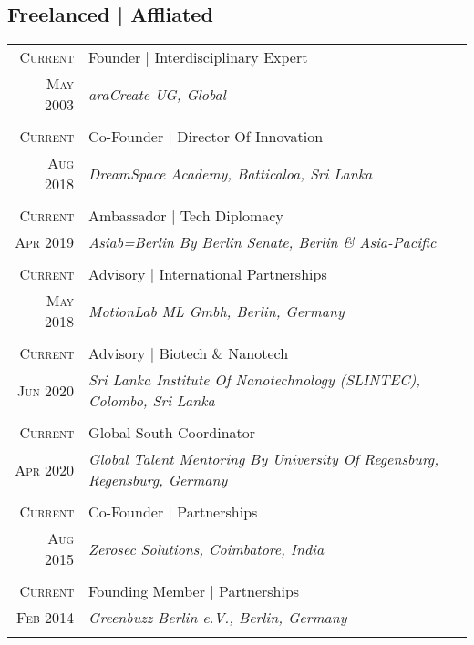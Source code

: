 \subsection{Freelanced | Affliated}
\begin{longtable}
	{r|p{12cm}}

	\textsc{Current} & Founder | Interdisciplinary Expert\\
	\textsc{May 2003}&\emph{araCreate UG, Global}\\
	\multicolumn{2}{c}{} \\

	\textsc{Current} & Co-Founder | Director Of Innovation\\
	\textsc{Aug 2018}&\emph{DreamSpace Academy, Batticaloa, Sri Lanka}\\
	\multicolumn{2}{c}{} \\

	\textsc{Current} & Ambassador | Tech Diplomacy\\
	\textsc{Apr 2019}&\emph{Asiab=Berlin By Berlin Senate, Berlin \& Asia-Pacific}\\
	\multicolumn{2}{c}{} \\

	\textsc{Current} & Advisory | International Partnerships\\
	\textsc{May 2018}&\emph{MotionLab ML Gmbh, Berlin, Germany}\\
	\multicolumn{2}{c}{} \\

	\textsc{Current} & Advisory | Biotech \& Nanotech\\
	\textsc{Jun 2020}&\emph{Sri Lanka Institute Of Nanotechnology (SLINTEC), Colombo, Sri Lanka}\\
	\multicolumn{2}{c}{} \\

	\textsc{Current} & Global South Coordinator\\
	\textsc{Apr 2020}&\emph{Global Talent Mentoring By University Of Regensburg, Regensburg, Germany}\\
	\multicolumn{2}{c}{} \\

	\textsc{Current} & Co-Founder | Partnerships\\
	\textsc{Aug 2015}&\emph{Zerosec Solutions, Coimbatore, India}\\
	\multicolumn{2}{c}{} \\

	\textsc{Current} & Founding Member | Partnerships\\
	\textsc{Feb 2014}&\emph{Greenbuzz Berlin e.V., Berlin, Germany}\\
	\multicolumn{2}{c}{} \\


\end{longtable}
